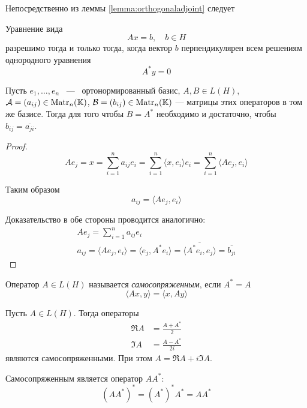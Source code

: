 Непосредственно из леммы \ref{lemma:orthogonaladjoint} следует
\begin{theorem}[Фредгольма]
    Уравнение вида
    \[ Ax = b, \quad b \in H \]
    разрешимо тогда и только тогда, когда вектор $b$ перпендикулярен всем
    решениям однородного уравнения
    \[ A^*y = 0 \]
\end{theorem}

\begin{lemma}\label{lemma:adjointmatrix}
    Пусть $e_1, \dotsc, e_n$ \, — \, ортонормированный базис, $A, B \in L(H)$,
    $\mathcal{A} = (a_{ij}) \in \mathrm{Matr}_{n}({\mathbb{K}})$, $\mathcal{B} = (b_{ij}) \in \mathrm{Matr}_{n}({\mathbb{K}})$
    — матрицы этих операторов в том же базисе. Тогда для того чтобы $B = A^*$
    необходимо и достаточно, чтобы $b_{ij} = \overline{a_{ji}}$.
\end{lemma}

\begin{proof}
    \[ Ae_j = x = \sum_{i=1}^n a_{ij}e_i = \sum_{i=1}^n \langle x, e_i\rangle
    e_i = \sum_{i=1}^n \langle Ae_j, e_i \rangle \]

    Таким образом 
    \[ a_{ij} = \langle Ae_j, e_i\rangle \]

    Доказательство в обе стороны проводится аналогично:
    \begin{gather*}
            Ae_j = \sum_{i=1}^n a_{ij} e_i \\
            a_{ij} = \langle Ae_j, e_i \rangle = \langle e_j, A^* e_i\rangle =
            \overline{\langle A^* e_i, e_j\rangle} = \overline{b_{ji}}
    \end{gather*}
\end{proof}

\begin{definition}
    Оператор $A\in L(H)$ называется \emph{самосопряженным}, если $A^* = A$
    \[ \langle Ax, y\rangle = \langle x, Ay\rangle \]
\end{definition}

\begin{example}
    Пусть $A\in L(H)$. Тогда операторы
    \begin{align*}
        \Re A &= \frac{A + A^*}{2} \\
        \Im A &= \frac{A - A^*}{2i}
    \end{align*}
    являются самосопряженными.  При этом $A = \Re A + i \Im A$.
\end{example}

\begin{example}
    Самосопряженным является оператор $AA^*$:
    \[ (AA^*)^* = (A^*)^* A^* = AA^* \]
\end{example}

